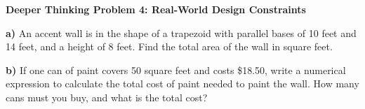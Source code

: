 \documentclass[12pt, letterpaper, fleqn]{article}
\begin{document}
\begin{tcolorbox}[colback=white, colframe=black, boxrule=1pt, arc=4mm, left=6mm, right=6mm, top=5mm, bottom=5mm]
\textbf{Deeper Thinking Problem 4: Real-World Design Constraints}

\medskip

\noindent
\textbf{a)} An accent wall is in the shape of a trapezoid with parallel bases of 10 feet and 14 feet, and a height of 8 feet. Find the total area of the wall in square feet.

\vspace{2.5cm}

\noindent
\textbf{b)} If one can of paint covers 50 square feet and costs \$18.50, write a numerical expression to calculate the total cost of paint needed to paint the wall. How many cans must you buy, and what is the total cost?

\vspace{2.5cm}
\end{tcolorbox}
\end{document}
